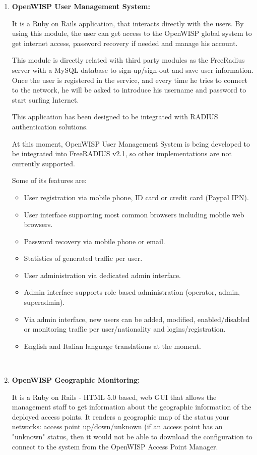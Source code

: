 \documentclass[draftclsnofoot,12pt,journal,onecolumn]{IEEEtran}
\begin{document}
\begin{enumerate}
\item[\fbox{1}] \textbf{OpenWISP User Management System:} 

It is a Ruby on Rails application, that interacts directly with the users. By using this module, the user can get access to the OpenWISP global system to get internet access, password recovery if needed and manage his account.

This module is directly related with third party modules as the FreeRadius server with a MySQL database to sign-up/sign-out and save user information. Once the user is registered in the service, and every time he tries to connect to the network, he will be asked to introduce his username and password to start surfing Internet.

This application has been designed to be integrated with RADIUS authentication solutions.

At this moment, OpenWISP User Management System is being developed to be integrated into FreeRADIUS v2.1, so other implementations are not currently supported.

Some of its features are:
\begin{itemize}
\item User registration via mobile phone, ID card or credit card (Paypal IPN).
\item User interface supporting most common browsers including mobile web browsers.
\item Password recovery via mobile phone or email.
\item Statistics of generated traffic per user.
\item User administration via dedicated admin interface.
\item Admin interface supports role based administration (operator, admin, superadmin).
\item Via admin interface, new users can be added, modified, enabled/disabled or monitoring traffic per user/nationality and logins/registration.
\item English and Italian language translations at the moment.
\end{itemize}\\

\item[\fbox{2}] \textbf{OpenWISP Geographic Monitoring:}

It is a Ruby on Rails - HTML 5.0 based, web GUI that allows the management staff to get information about the geographic information of the deployed access points. It renders a geographic map of the status your networks: access point up/down/unknown (if an access point has an "unknown" status, then it would not be able to download the configuration to connect to the system from the OpenWISP Access Point Manager. \\


\end{enumerate}
\end{document}
